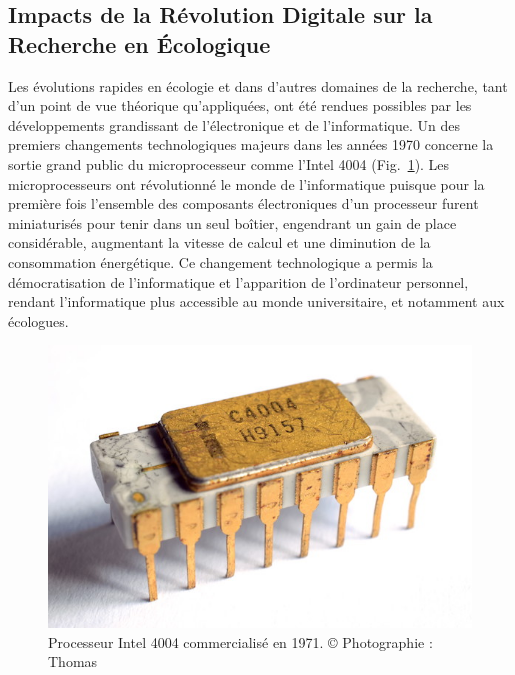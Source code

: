 \begin{refsection}
\hypertarget{impacts-de-la-ruxe9volution-digitale-sur-la-recherche-en-uxe9cologique}{%
\subsection{Impacts de la Révolution Digitale sur la Recherche en
Écologique}\label{impacts-de-la-ruxe9volution-digitale-sur-la-recherche-en-uxe9cologique}}

Les évolutions rapides en écologie et dans d'autres domaines de la
recherche, tant d'un point de vue théorique qu'appliquées, ont été
rendues possibles par les développements grandissant de l'électronique
et de l'informatique. Un des premiers changements technologiques majeurs
dans les années 1970 concerne la sortie grand public du microprocesseur
comme l'Intel 4004 (Fig.~\ref{fig:intro7}). Les microprocesseurs ont
révolutionné le monde de l'informatique puisque pour la première fois
l'ensemble des composants électroniques d'un processeur furent
miniaturisés pour tenir dans un seul boîtier, engendrant un gain de
place considérable, augmentant la vitesse de calcul et une diminution de
la consommation énergétique. Ce changement technologique a permis la
démocratisation de l'informatique et l'apparition de l'ordinateur
personnel, rendant l'informatique plus accessible au monde
universitaire, et notamment aux écologues.

\begin{figure}
\hypertarget{fig:intro7}{%
\centering
\includegraphics{02-Introduction/figures/Intel_C4004.jpg}
\caption[Processeur Intel 4004 commercialisé en 1971]{Processeur Intel 4004 commercialisé en 1971. © Photographie :
Thomas \textcite{Nguyen}}\label{fig:intro7}
}
\end{figure}


\end{refsection}
